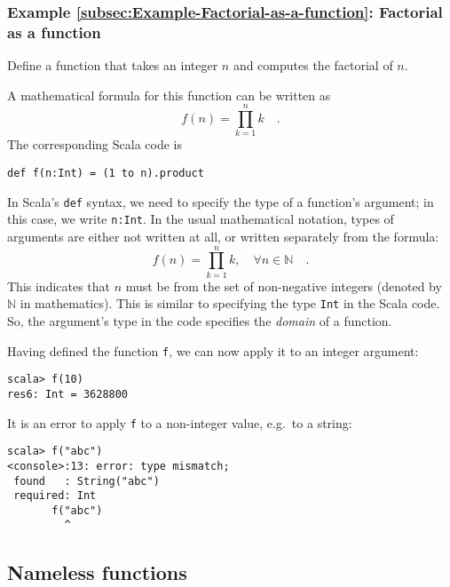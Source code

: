 \subsubsection{Example \label{subsec:Example-Factorial-as-a-function}\ref{subsec:Example-Factorial-as-a-function}:
Factorial as a function}

Define a function that takes an integer $n$ and computes the factorial
of $n$.

A mathematical formula for this function can be written as
\[
f\left(n\right)=\prod_{k=1}^{n}k\quad.
\]
The corresponding Scala code is
\begin{lstlisting}
def f(n:Int) = (1 to n).product
\end{lstlisting}

In Scala's \texttt{}\lstinline!def! syntax, we need to specify the
type of a function's argument; in this case, we write \lstinline!n:Int!.
In the usual mathematical notation, types of arguments are either
not written at all, or written separately from the formula:
\[
f(n)=\prod_{k=1}^{n}k,\quad\forall n\in\mathbb{N}\quad.
\]
This indicates that $n$ must be from the set of non-negative integers
(denoted by $\mathbb{N}$ in mathematics). This is similar to specifying
the type \texttt{}\lstinline!Int! in the Scala code. So, the argument's
type in the code specifies the \emph{domain} of a function.

Having defined the function \lstinline!f!, we can now apply it to
an integer argument: 
\begin{lstlisting}
scala> f(10)
res6: Int = 3628800
\end{lstlisting}
It is an error to apply \lstinline!f! to a non-integer value, e.g.\ to
a string:
\begin{lstlisting}
scala> f("abc")
<console>:13: error: type mismatch;
 found   : String("abc")
 required: Int
       f("abc")
         ^ 
\end{lstlisting}


\subsection{Nameless functions\label{subsec:Nameless-functions}}

